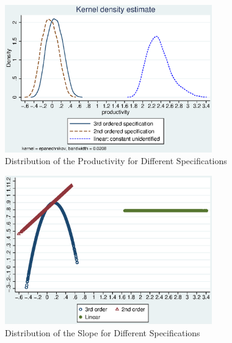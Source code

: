 \documentclass{article}
\begin{document}
\begin{figure}[h]
\caption{Distribution of the Productivity for Different Specifications}
\centering
\includegraphics[width=0.8\textwidth]{RobustOmegaKdensity.eps}

\label{robfig1}
\end{figure}


\begin{figure}[h]
\caption{Distribution of the Slope for Different Specifications}
\centering
\includegraphics[width=0.8\textwidth]{RobustOmegaSlope.eps}

\label{robfig2}
\end{figure}
\end{document}
